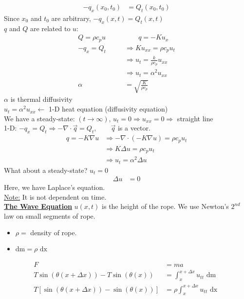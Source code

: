 \documentclass{article}
\newcommand{\topic}[1]{\textbf{\underline{#1}}}
\newcommand{\grad}{\nabla}
\newcommand{\dx}{\text{ dx }}
\newcommand{\note}{\underline{Note:} }
\begin{document}
\begin{align}
  -q_x(x_0, t_0) & = Q_t(x_0, t_0)
\end{align}
Since $x_0$ and $t_0$ are arbitrary, $-q_x(x, t) = Q_t(x, t)$\\
$q$ and $Q$ are related to $u$:
\begin{align}
  Q = \rho c_p u \qquad & \qquad q = -Ku_x\\
  -q_x = Q_t & \Rightarrow Ku_{xx} = \rho c_p u_t\\
  & \Rightarrow u_t = \frac{k}{\rho c_p} u_{xx}\\
  & \Rightarrow u_t = \alpha^2 u_{xx}\\
  \alpha & = \sqrt{\frac{K}{\rho c_p}}
\end{align}
$\alpha$ is thermal diffusivity\\
$u_t = \alpha^2 u_{xx} \leftarrow$ 1-D heat equation (diffusivity equation)\\
We have a steady-state: $(t \rightarrow \infty)$, $u_t = 0 \Rightarrow u_{xx} = 0 \Rightarrow $ straight line\\
1-D: $-q_x = Q_t \Rightarrow -\grad \cdot \vec q = Q_t, \qquad \vec q$ is a vector.
\begin{align}
  q = -K \grad u & \Rightarrow - \grad \cdot (-K \grad u) = \rho c_p u_t\\
  & \Rightarrow K \Delta u = \rho c_p u_t\\
  & \Rightarrow u_t = \alpha^2 \Delta u
\end{align}
What about a steady-state? $u_t = 0$
\begin{align}
  \Delta u & = 0
\end{align}
Here, we have Laplace's equation.\\
\note It is not dependent on time.\\
\topic{The Wave Equation}
$u(x, t)$ is the height of the rope. We use Newton's $2^{nd}$ law on small segments of rope.
\begin{itemize}
  \item $\rho = $ density of rope.
  \item $\text{dm} = \rho \dx$
\end{itemize}
\begin{align}
  F & = ma\\
  T \sin(\theta(x + \Delta x)) - T \sin(\theta(x)) & = \int^{x + \Delta x}_x u_{tt} \text{ dm}\\
  T[ \sin(\theta (x + \Delta x)) - \sin(\theta (x))] & = \rho \int^{x + \Delta x}_{x} u_{tt} \dx
\end{align}
\end{document}
